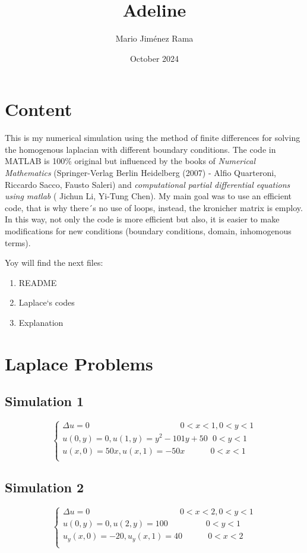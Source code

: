 \documentclass{article}
\title{Adeline}
\author{Mario Jiménez Rama}
\date{October 2024}
\begin{document}
\maketitle

\section{Content}
This is my numerical simulation using the method of finite differences for solving the homogenous laplacian with different boundary conditions. The code in MATLAB is 100\% original but influenced by the books of  \textit{Numerical Mathematics} (Springer-Verlag Berlin Heidelberg (2007) - Alfio Quarteroni, Riccardo Sacco, Fausto Saleri) and \textit{computational partial differential equations using matlab} ( Jichun Li, Yi-Tung Chen). 
My main goal was to use an efficient code, that is why there´s no use of loops, instead,  the kronicher matrix is employ. In this way, not only the code is more efficient but also, it is easier to make modifications for new conditions (boundary conditions, domain, inhomogenous terms). 

Yoy will find the next files: 
\begin{enumerate}
    \item README
    \item Laplace`s codes
    \item Explanation
\end{enumerate}

\section{Laplace Problems}
\subsection{Simulation 1}
\[ \left\{
  \begin{array}{lr}
    \Delta u = 0 \hspace{131pt} 0<x<1,0<y<1\\
    u(0,y) = 0 , u(1,y) = y^{2}  -101y + 50 \hspace{7pt} 0<y<1 \\
    u(x,0) = 50x , u(x,1) = -50x \hspace{37pt} 0<x<1 \\
  \end{array}
\right.
\]
\subsection{Simulation 2}
\[ \left\{
  \begin{array}{lr}
    \Delta u = 0 \hspace{130pt} 0<x<2,0<y<1\\
    u(0,y) = 0 , u(2,y) = 100 \hspace{55pt} 0<y<1 \\
    u_y(x,0) = -20 , u_y(x,1) = 40 \hspace{37pt} 0<x<2 \\
  \end{array}
\right.
\]
\end{document}
